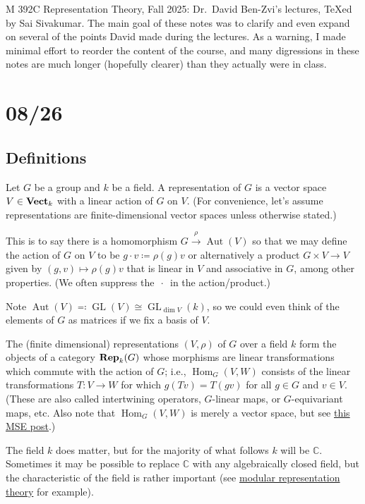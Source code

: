 \documentclass[11pt,leqno]{article}
\theoremstyle{plain}
\theoremstyle{definition}
\numberwithin{equation}{section}
\numberwithin{lem}{section}
\DeclareMathOperator{\GL}{GL}
\DeclareMathOperator{\Hom}{Hom}
\DeclareMathOperator{\Aut}{Aut}
\newcommand{\catname}[1]{{\normalfont\mathbf{#1}}}
\newcommand{\Vect}{\catname{Vect}}
\newcommand{\Rep}{\catname{Rep}}
\begin{document}
M 392C Representation Theory, Fall 2025: Dr.~David Ben-Zvi's lectures, \TeX ed by Sai Sivakumar. The main goal of these notes was to clarify and even expand on several of the points David made during the lectures. As a warning, I made minimal effort to reorder the content of the course, and many digressions in these notes are much longer (hopefully clearer) than they actually were in class.
\tableofcontents

\newpage\section{08/26}
\subsection{Definitions}
Let $G$ be a group and $k$ be a field. A representation of $G$ is a vector space $V\in \Vect_k$ with a linear action of $G$ on $V$. (For convenience, let's assume representations are finite-dimensional vector spaces unless otherwise stated.)

This is to say there is a homomorphism $G\xrightarrow{\rho}\Aut(V)$ so that we may define the action of $G$ on $V$ to be $g\cdot v \coloneqq \rho(g)v$ or alternatively a product $G\times V\to V$ given by $(g,v)\mapsto \rho(g)v$ that is linear in $V$ and associative in $G$, among other properties. (We often suppress the $\,\cdot\,$ in the action/product.)

Note $\Aut(V) \eqqcolon \GL(V) \cong \GL_{\dim V}(k)$, so we could even think of the elements of $G$ as matrices if we fix a basis of $V$.

The (finite dimensional) representations $(V,\rho)$ of $G$ over a field $k$ form the objects of a category $\Rep_k(G)$ whose morphisms are linear transformations which commute with the action of $G$; i.e., $\Hom_G(V,W)$ consists of the linear transformations $T\colon V\to W$ for which $g(Tv) = T(gv)$ for all $g\in G$ and $v\in V$. (These are also called intertwining operators, $G$-linear maps, or $G$-equivariant maps, etc. Also note that $\Hom_G(V,W)$ is merely a vector space, but see \href{https://math.stackexchange.com/questions/2334514/whats-the-internal-hom-of-linear-representations-of-categories}{this MSE post}.) 

The field $k$ does matter, but for the majority of what follows $k$ will be $\mathbb C$. Sometimes it may be possible to replace $\mathbb C$ with any algebraically closed field, but the characteristic of the field is rather important (see \href{https://en.wikipedia.org/wiki/Modular_representation_theory}{modular representation theory} for example). 
\end{document}

